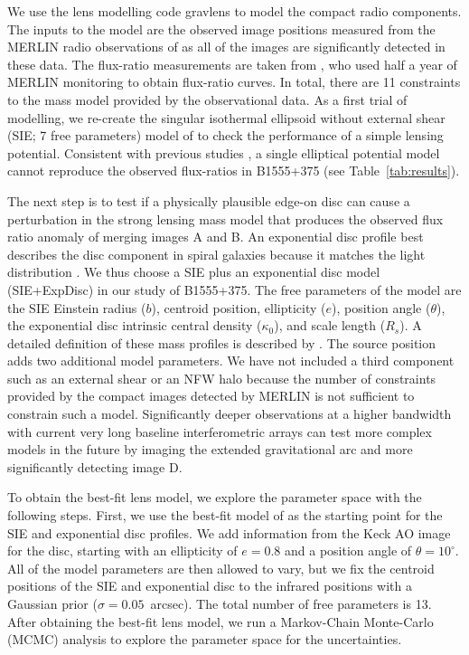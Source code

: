 \documentclass[a4paper,fleqn,usenatbib,useAMS]{mnras}
\begin{document}
We use the lens modelling code {\sc gravlens} \citep{Kee01} to model the compact radio components. The inputs to the model are the observed image positions measured from the MERLIN radio observations of \citet{Marlow99} as all of the images are significantly detected in these data. The flux-ratio measurements are taken from \citet{K03}, who used half a year of MERLIN monitoring to obtain flux-ratio curves. In total, there are 11 constraints to the mass model provided by the observational data. As a first trial of modelling, we re-create the singular isothermal ellipsoid without external shear (SIE; 7 free parameters) model of \citet{Marlow99} to check the performance of a simple lensing potential. Consistent with previous studies \citep{Marlow99,Xu15}, a single elliptical potential model cannot reproduce the observed flux-ratios in B1555+375 (see Table~\ref{tab:results}). 

The next step is to test if a physically plausible edge-on disc can cause a perturbation in the strong lensing mass model that produces the observed flux ratio anomaly of  merging images A and B. An exponential disc profile best describes the disc component in spiral galaxies because it matches the light distribution \citep{Kee98}. We thus choose a SIE plus an exponential disc model (SIE+ExpDisc) in our study of B1555+375. The free parameters of the model are the SIE Einstein radius ($b$), centroid position, ellipticity ($e$), position angle ($\theta$), the exponential disc intrinsic central density ($\kappa_0$), and scale length ($R_s$). A detailed definition of these mass profiles is described by \citet{Kee01}. The source position adds two additional model parameters. We have not included a third component such as an external shear or an NFW halo because the number of constraints provided by the compact images detected by MERLIN is not sufficient to constrain such a model. Significantly deeper observations at a higher bandwidth with current very long baseline interferometric arrays can test more complex models in the future by imaging the extended gravitational arc and more significantly detecting image D. 

To obtain the best-fit lens model, we explore the parameter space with the following steps. First, we use the best-fit model of \citet{Marlow99} as the starting point for the SIE and exponential disc profiles. We add information from the Keck AO image for the disc, starting with an ellipticity of $e=0.8$ and a position angle of $\theta=10^\circ$.  All of the model parameters are then allowed to vary, but we fix the centroid positions of the SIE and exponential disc to the infrared positions with a Gaussian prior ($\sigma = 0.05 $~arcsec). The total number of free parameters is 13. After obtaining the best-fit lens model, we run a Markov-Chain Monte-Carlo (MCMC) analysis to explore the parameter space for the uncertainties.
\end{document}
